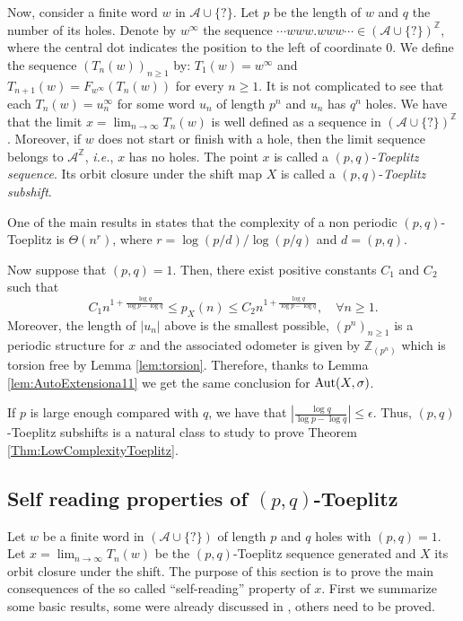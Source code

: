 \documentclass{daj}
\theoremstyle{plain}
\theoremstyle{definition}
\begin{document}
Now, consider a finite word $w$ in $\mathcal{A}\cup \{ \text{?}\}$.  
Let $p$ be the length of $w$ and $q$ the number of its holes.
Denote by $w^\infty$ the sequence $\cdots www.www\cdots \in (\mathcal{A}\cup \{ \text{?} \})^{\mathbb{Z}}$, where the central dot indicates the position to the left of coordinate $0$. 
We define the sequence $(T_n(w))_{n\geq 1}$ by: $T_1(w)=w^\infty$ and 
$T_{n+1}(w)=F_{w^{\infty}}(T_n(w))$ for every $n\geq 1$. It is not complicated to see that each 
$T_n(w) = u_{n}^{\infty}$  for some word $u_{n}$ of length $p^n$ and  $u_{n}$ has $q^n$ holes.
We have that the limit $\displaystyle x=\lim_{n\to \infty} T_n(w)$ is well defined as a sequence in $(\mathcal{A}\cup \{\text{?}\})^{\mathbb{Z}}$. Moreover, if $w$ does not start or finish with a hole, then the limit sequence belongs to $\mathcal{A}^{\mathbb{Z}}$, {\em i.e.}, $x$ has no holes. 
The point $x$ is called a $(p,q)$-{\em Toeplitz sequence}.
Its orbit closure under the shift map $X$ is called a $(p,q)$-{\em Toeplitz subshift}. 

One of the main results in \cite[Theorem 5]{CK}  states that the complexity of a non periodic
$(p,q)$-Toeplitz is $\Theta(n^r)$, where $r=\log(p/d)/\log(p/q)$ and $d=(p,q)$.

Now suppose that $(p,q)=1$.
Then, there exist positive constants $C_1$ and $C_2$ such that 
\begin{equation}\label{eq:complexity}
C_1 n^{1+\frac{\log q}{\log p -\log q}} \leq p_X(n)\leq C_2 n^{1+\frac{\log q}{\log p -\log q} } ,\quad \forall n\geq 1.
\end{equation}
Moreover, the length of $|u_n|$ above is the smallest possible, $(p^n)_{n\geq 1}$ is a periodic structure for $x$ and the associated odometer is given by $\mathbb{Z}_{(p^n)}$ which is torsion free by Lemma \ref{lem:torsion}. 
Therefore, thanks to Lemma \ref{lem:AutoExtensiona11} we get the same conclusion for ${\rm Aut}(X,\sigma)$. 

If $p$ is large enough compared with $q$, we have that $|\frac{\log q}{\log p -\log q}|\leq \epsilon$. Thus, $(p,q)$-Toeplitz subshifts is a natural class to study to prove Theorem \ref{Thm:LowComplexityToeplitz}.


\subsection{Self reading properties of $(p,q)$-Toeplitz}
Let $w$ be a finite word in  $(\mathcal{A}\cup \{?\})$ of length $p$ and $q$ holes with $(p,q)=1$. Let $x=\lim_{n\to \infty} T_n(w)$ be the $(p,q)$-Toeplitz sequence generated and $X$ its orbit closure under the shift. The purpose of this section is to prove the main consequences of the 
so called ``self-reading'' property of $x$. 
First we summarize some basic results, some were already discussed in \cite{CK}, others need to be proved. 
\end{document}
